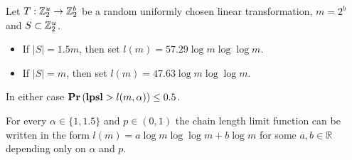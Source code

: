 \begin{theorem}
\label{theorem-model-chain-limit-rule}
Let $T: \mathbb{Z}_{2}^{u} \rightarrow \mathbb{Z}_{2}^{b}$ be a random uniformly chosen linear transformation, $m = 2 ^ b$ and $S \subset \mathbb{Z}_{2}^{u}$.
\begin{itemize}
\item If $|S| = 1.5 m$, then set $l(m) = 57.29 \log m \log \log m$.
\item If $|S| = m$, then set $l(m) = 47.63 \log m \log \log m$.
\end{itemize}
In either case $\mathbf{Pr}\left(\mathbf{lpsl} > l(m, \alpha)\right) \leq 0.5$.

For every $\alpha \in \{1, 1.5\}$ and $p \in (0, 1)$ the chain length limit function can be written in the form $ l(m) = a \log m \log \log m + b \log m $ for some $a, b \in \mathbb{R}$ depending only on $\alpha$ and $p$.
\end{theorem}
